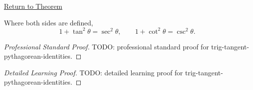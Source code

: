 \newpage
{}
\label{prf:trig-tangent-pythagorean-identities}

\begin{remark*}[Return]
\hyperref[thm:trig-tangent-pythagorean-identities]{Return to Theorem}
\end{remark*}

\begin{theorem*}
Where both sides are defined,
\[
  1+\tan^2\theta=\sec^2\theta,
  \qquad
  1+\cot^2\theta=\csc^2\theta.
\]
\end{theorem*}

\begin{proof}[Professional Standard Proof]
\LRAProofBodyStart
TODO: professional standard proof for trig-tangent-pythagorean-identities.
\end{proof}

\begin{proof}[Detailed Learning Proof]
\LRAProofBodyStart
TODO: detailed learning proof for trig-tangent-pythagorean-identities.
\end{proof}

\clearpage
